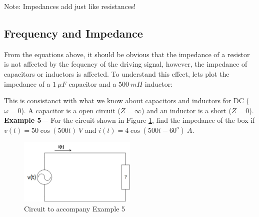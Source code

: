 \documentclass{handout}
\begin{document}
Note: Impedances add just like resistances!

\subsection{Frequency  and Impedance}
From the equations above, it should be obvious that the impedance of a resistor is not affected by the fequency of the driving signal, however, the impedance of capacitors or inductors is affected.  To understand this effect, lets plot the impedance of a $1\ \mu F$ capacitor and a $500\ mH$ inductor:

This is consistanct with what we know about capacitors and inductors for DC ($\omega =0$).  A capacitor is a open circuit ($Z=\infty$) and an inductor is a short ($Z=0$).
\newpage
\clearpage
\pagebreak
\textbf{Example 5}--- For the circuit shown in Figure \ref{fig: Example5}, find the impedance of the box if $v(t) = 50\cos(500t)\  V$ and $i(t)= 4\cos(500t-60^o)\ A$.

\begin{figure} [h!]
\centering
\includegraphics[width=0.5\textwidth]{Example5.jpg}
\caption{Circuit to accompany Example 5}
\label{fig: Example5}
\end{figure}




\newpage
\clearpage
\pagebreak

\newpage
\clearpage
\pagebreak

\newpage
\clearpage
\pagebreak
\end{document}
